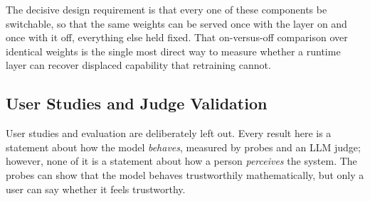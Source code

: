 The decisive design requirement is that every one of these components be switchable, so that the same weights can be served once with the layer on and once with it off, everything else held fixed. That on-versus-off comparison over identical weights is the single most direct way to measure whether a runtime layer can recover displaced capability that retraining cannot.

\subsection{User Studies and Judge Validation}
\label{subsec:conclusion-future-user-studies}

User studies and evaluation are deliberately left out. Every result here is a statement about how the model \emph{behaves}, measured by probes and an LLM judge; however, none of it is a statement about how a person \emph{perceives} the system. The probes can show that the model behaves trustworthily mathematically, but only a user can say whether it feels trustworthy.

